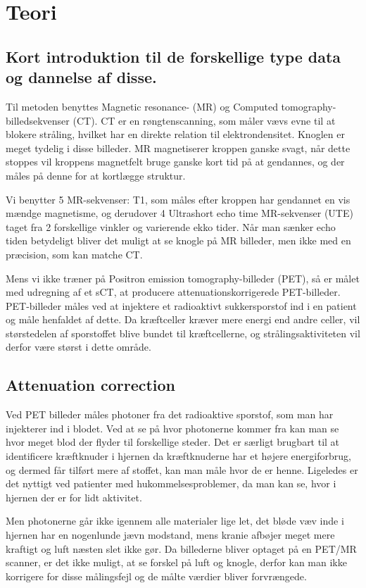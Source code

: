 \section{Teori}
\subsection{Kort introduktion til de forskellige type data og dannelse af disse.}


Til metoden benyttes Magnetic resonance- (MR) og Computed
tomo\-graphy-billedsekvenser (CT). CT er en røngtenscanning, som måler
vævs evne til at blokere stråling, hvilket har en direkte relation
til elektrondensitet. Knoglen er meget tydelig i disse billeder. MR
magnetiserer kroppen ganske svagt, når dette stoppes vil kroppens
magnetfelt bruge ganske kort tid på at gendannes, og der måles på
denne for at kortlægge struktur.

Vi benytter 5 MR-sekvenser: T1, som måles efter kroppen har gendannet en vis
mændge magnetisme, og derudover 4 Ultrashort echo time MR-sekvenser (UTE)
taget fra 2 forskellige vinkler og varierende ekko tider. Når man sænker echo
tiden betydeligt bliver det muligt at se knogle på MR billeder, men ikke med
en præcision, som kan matche CT.

Mens vi ikke træner på Positron emission tomography-billeder (PET), så
er målet med udregning af et sCT, at producere attenuationskorrigerede
PET-billeder. PET-billeder måles ved at injektere et radioaktivt
sukkersporstof ind i en patient og måle henfaldet af dette. Da
kræftceller kræver mere energi end andre celler, vil størstedelen af
sporstoffet blive bundet til kræftcellerne, og strålingsaktiviteten
vil derfor være størst i dette område.

\subsection{Attenuation correction} 

Ved PET billeder måles photoner fra det radioaktive sporstof, som man
har injekterer ind i blodet. Ved at se på hvor photonerne kommer fra kan
man se hvor meget blod der flyder til forskellige steder. Det er særligt
brugbart til at identificere kræftknuder i hjernen da kræftknuderne har
et højere energiforbrug, og dermed får tilført mere af stoffet, kan
man måle hvor de er henne. Ligeledes er det nyttigt ved patienter med
hukommelsesproblemer, da man kan se, hvor i hjernen der er for lidt
aktivitet.

Men photonerne går ikke igennem alle materialer lige let, det bløde væv
inde i hjernen har en nogenlunde jævn modstand, mens kranie afbøjer
meget mere kraftigt og luft næsten slet ikke gør. Da billederne bliver
optaget på en PET/MR scanner, er det ikke muligt, at se forskel på luft
og knogle, derfor kan man ikke korrigere for disse målingsfejl og de
målte værdier bliver forvrængede.

